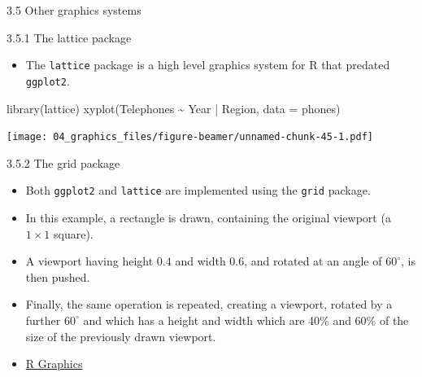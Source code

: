 \documentclass[
  9pt,
  a4paper,
  ignorenonframetext,
  notheorems]{beamer}
\newenvironment{Shaded}{\begin{snugshade}}{\end{snugshade}}
\newcommand{\AttributeTok}[1]{\textcolor[rgb]{0.40,0.45,0.13}{#1}}
\newcommand{\FunctionTok}[1]{\textcolor[rgb]{0.28,0.35,0.67}{#1}}
\newcommand{\NormalTok}[1]{\textcolor[rgb]{0.00,0.23,0.31}{#1}}
\newcommand{\SpecialCharTok}[1]{\textcolor[rgb]{0.37,0.37,0.37}{#1}}
\providecommand{\tightlist}{%
  \setlength{\itemsep}{0pt}\setlength{\parskip}{0pt}}\usepackage{longtable,booktabs,array}
\begin{document}
\begin{frame}[fragile]{3.5 Other graphics systems}
\protect\hypertarget{other-graphics-systems}{}
\begin{block}{3.5.1 The lattice package}
\protect\hypertarget{the-lattice-package}{}
\begin{itemize}
\tightlist
\item
  The \texttt{lattice} package is a high level graphics system for R
  that predated \texttt{ggplot2}.
\end{itemize}

\begin{Shaded}
\begin{Highlighting}[]
\FunctionTok{library}\NormalTok{(lattice)}
\FunctionTok{xyplot}\NormalTok{(Telephones }\SpecialCharTok{\textasciitilde{}}\NormalTok{ Year }\SpecialCharTok{|}\NormalTok{ Region, }\AttributeTok{data =}\NormalTok{ phones)}
\end{Highlighting}
\end{Shaded}

\texttt{[image: 04\_graphics\_files/figure-beamer/unnamed-chunk-45-1.pdf]}
\end{block}
\end{frame}

\begin{frame}[fragile]
\begin{block}{3.5.2 The grid package}
\protect\hypertarget{the-grid-package}{}
\begin{itemize}
\item
  Both \texttt{ggplot2} and \texttt{lattice} are implemented using the
  \texttt{grid} package.
\item
  In this example, a rectangle is drawn, containing the original
  viewport (a \(1 \times 1\) square).
\item
  A viewport having height \(0.4\) and width \(0.6\), and rotated at an
  angle of \(60^{\circ}\), is then pushed.
\item
  Finally, the same operation is repeated, creating a viewport, rotated
  by a further \(60^{\circ}\) and which has a height and width which are
  40\% and 60\% of the size of the previously drawn viewport.
\item
  \href{https://www.routledge.com/R-Graphics-Third-Edition/Murrell/p/book/9780367780692}{R
  Graphics}
\end{itemize}
\end{block}
\end{frame}
\end{document}
